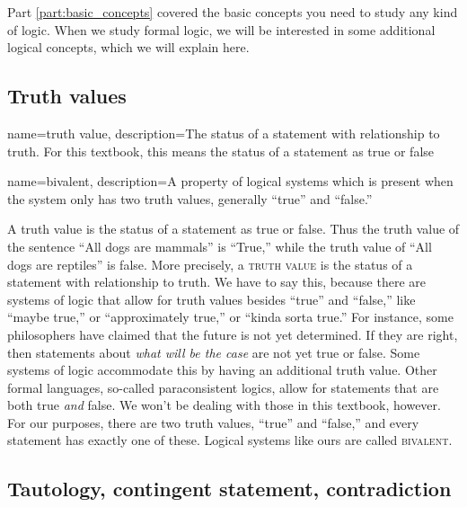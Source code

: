 Part \ref{part:basic_concepts} covered the basic concepts you need to study any kind of logic. When we study formal logic, we will be interested in some additional logical concepts, which we will explain here. 


\subsection{Truth values}

{
  name=truth value,
  description={The status of a statement with relationship to truth. For  this textbook, this means the status of a statement as true or false}
}

{
  name=bivalent,
  description={A property of logical systems which is present when the system only has two truth values, generally ``true'' and ``false.''}
}



A truth value is the status of a statement as true or false. Thus the truth value of the sentence ``All dogs are mammals'' is ``True,'' while the truth value of ``All dogs are reptiles'' is false. More precisely, a \textsc{\gls{truth value}} \label{def:Truth_value} is the status of a statement with relationship to truth. We have to say this, because there are systems of logic that allow for truth values besides ``true'' and ``false,'' like ``maybe true,'' or ``approximately true,'' or ``kinda sorta true.'' For instance, some philosophers have claimed that the future is not yet determined. If they are right, then statements about \emph{what will be the case} are not yet true or false. Some systems of logic accommodate this by having an additional truth value. Other formal languages, so-called paraconsistent logics, allow for statements that are both true \emph{and} false. We won't be dealing with those in this textbook, however. For our purposes, there are two truth values, ``true'' and ``false,'' and every statement has exactly one of these. Logical systems like ours are called \textsc{\gls{bivalent}}. \label{def:Bivalent}








\subsection{Tautology, contingent statement, contradiction}

